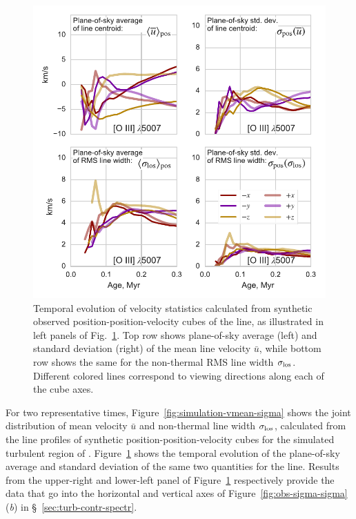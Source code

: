 \documentclass[useAMS,usenatbib]{mn2e}
\begin{document}
\begin{figure}
  \centering
  \includegraphics[width=\linewidth]{pos-stats-evo-O35007}
  \caption{Temporal evolution of velocity statistics calculated from
    synthetic observed position-position-velocity cubes of the \oiii{}
    line, as illustrated in left panels of
    Fig.~\ref{fig:simulation-stats-evo}.  Top row shows plane-of-sky
    average (left) and standard deviation (right) of the mean line
    velocity \(\bar{u}\), while bottom row shows the same for the
    non-thermal RMS line width \(\sigma_{\mathrm{los}}\).  Different colored
    lines correspond to viewing directions along each of the cube
    axes.}
  \label{fig:simulation-stats-evo}
\end{figure}


For two representative times, Figure~\ref{fig:simulation-vmean-sigma}
shows the joint distribution of mean velocity \(\bar{u}\) and
non-thermal line width \(\sigma_{\mathrm{los}}\), calculated from the line
profiles of synthetic position-position-velocity cubes for the
simulated turbulent \hii{} region of \citet{Medina:2014a}.
Figure~\ref{fig:simulation-stats-evo} shows the temporal evolution of
the plane-of-sky average and standard deviation of the same two
quantities for the \oiii{} line.  Results from the upper-right and
lower-left panel of Figure~\ref{fig:simulation-stats-evo} respectively
provide the data that go into the horizontal and vertical axes of
Figure~\ref{fig:obs-sigma-sigma}(\textit{b}) in
\S~\ref{sec:turb-contr-spectr}.
\end{document}
